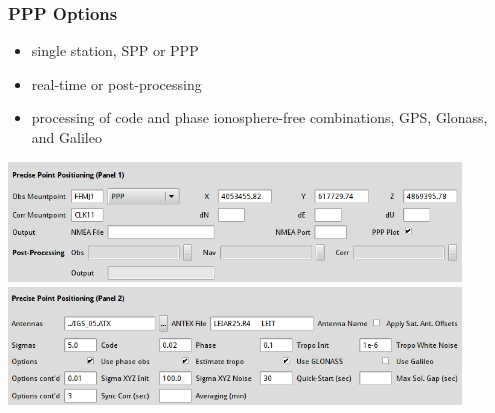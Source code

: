 \documentclass[10pt]{beamer}
\begin{document}

\begin{frame}
  \frametitle{PPP Options}
  \begin{itemize}
  \item single station, SPP or PPP
  \item real-time or post-processing
  \item processing of code and phase ionosphere-free combinations, GPS,
    Glonass, and Galileo
  \end{itemize}
  \begin{center}
    \includegraphics[width=0.9\textwidth,angle=0]{ppp_opt1.png} \\[2mm]
    \includegraphics[width=0.9\textwidth,angle=0]{ppp_opt2.png}
  \end{center}
\end {frame}
\end{document}
